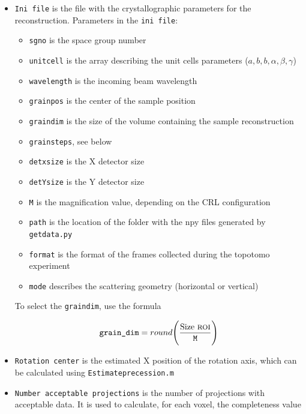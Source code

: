 \documentclass[11pt]{scrartcl}
\begin{document}
\begin{itemize}
    \item {\texttt{Ini file}} is the file with the crystallographic parameters for the reconstruction. Parameters in the {\texttt{ini file}}:
    \begin{itemize}
        \item {\texttt{sg\textunderscore no}} is the space group number
        \item {\texttt{unit\textunderscore cell}} is the array describing the unit cells parameters ($a,b,b,\alpha, \beta, \gamma$)
        \item {\texttt{wavelength}} is the incoming beam wavelength
        \item {\texttt{grain\textunderscore pos}} is the center of the sample position
        \item {\texttt{grain\textunderscore dim}} is the size of the volume containing the sample reconstruction 
        \item {\texttt{grain\textunderscore steps}}, see below
        \item {\texttt{detx\textunderscore size}} is the {\footnotesize{X}} detector size
        \item {\texttt{detY\textunderscore size}} is the {\footnotesize{Y}} detector size
        \item {\texttt{M}} is the magnification value, depending on the {\footnotesize{CRL}} configuration
        \item {\texttt{path}} is the location of the folder with the npy files generated by {\texttt{getdata.py}}
        \item {\texttt{format}} is the format of the frames collected during the topotomo experiment
        \item {\texttt{mode}} describes the scattering geometry (horizontal or vertical)
    \end{itemize}
    
    To select the {\texttt{grain\textunderscore dim}}, use the formula 
    
    \begin{equation}
        {\texttt{grain\textunderscore dim}} = round \Bigg( \frac{{\text{Size {\footnotesize{ROI}}}}}{\texttt{M}} \Bigg)
    \end{equation}

    \item {\texttt{Rotation center}} is the estimated {\footnotesize{X}} position of the rotation axis, which can be calculated using {\texttt{Estimate\textunderscore precession.m}}
    \item {\texttt{Number acceptable projections}} is the number of projections with acceptable data. It is used to calculate, for each voxel, the completeness value 
\end{itemize}
\end{document}
